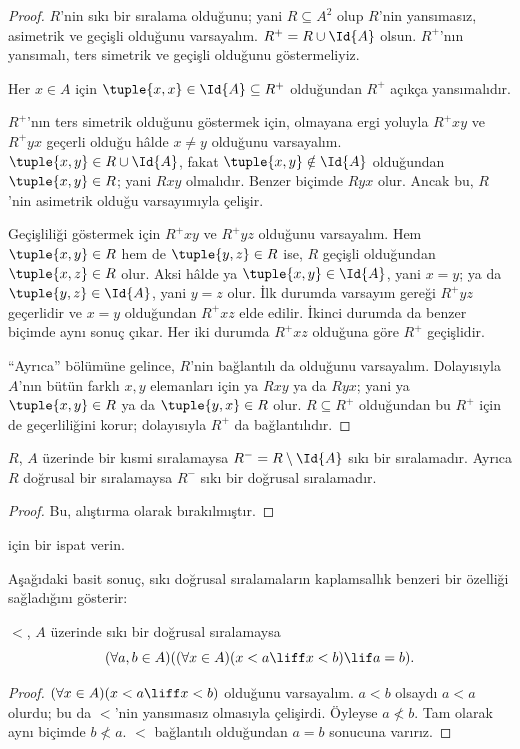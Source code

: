 \documentclass[../../../include/open-logic-section]{subfiles}
\begin{document}
\begin{proof}
$R$'nin sıkı bir sıralama olduğunu; yani $R \subseteq A^2$ olup $R$'nin
yansımasız, asimetrik ve geçişli olduğunu varsayalım. $R^+=R\cup\Id{A}$ olsun.
$R^+$'nın yansımalı, ters simetrik ve geçişli olduğunu göstermeliyiz.

Her $x \in A$ için $\tuple{x,x}\in\Id{A}\subseteq R^+$ olduğundan $R^+$
açıkça yansımalıdır.

$R^+$'nın ters simetrik olduğunu göstermek için, olmayana ergi yoluyla $R^+xy$
ve $R^+yx$ geçerli olduğu hâlde $x \neq y$ olduğunu varsayalım.
$\tuple{x,y}\in R\cup\Id{A}$, fakat $\tuple{x,y}\notin\Id{A}$ olduğundan
$\tuple{x,y}\in R$; yani $Rxy$ olmalıdır. Benzer biçimde $Ryx$ olur. Ancak bu,
$R$'nin asimetrik olduğu varsayımıyla çelişir.

Geçişliliği göstermek için $R^+xy$ ve $R^+yz$ olduğunu varsayalım. Hem
$\tuple{x,y}\in R$ hem de $\tuple{y,z}\in R$ ise, $R$ geçişli olduğundan
$\tuple{x,z}\in R$ olur. Aksi hâlde ya $\tuple{x,y}\in\Id{A}$, yani $x=y$;
ya da $\tuple{y,z}\in\Id{A}$, yani $y=z$ olur. İlk durumda varsayım gereği
$R^+yz$ geçerlidir ve $x=y$ olduğundan $R^+xz$ elde edilir. İkinci durumda da
benzer biçimde aynı sonuç çıkar. Her iki durumda $R^+xz$ olduğuna göre $R^+$
geçişlidir.

``Ayrıca'' bölümüne gelince, $R$'nin bağlantılı da olduğunu varsayalım.
Dolayısıyla $A$'nın bütün farklı $x,y$ elemanları için ya $Rxy$ ya da $Ryx$; yani ya
$\tuple{x,y}\in R$ ya da $\tuple{y,x}\in R$ olur. $R\subseteq R^+$ olduğundan
bu $R^+$ için de geçerliliğini korur; dolayısıyla $R^+$ da bağlantılıdır.
\end{proof}

\begin{prop}
$R$, $A$ üzerinde bir kısmi sıralamaysa $R^-=R\setminus\Id{A}$ sıkı bir
sıralamadır. Ayrıca $R$ doğrusal bir sıralamaysa $R^-$ sıkı bir doğrusal
sıralamadır.
\end{prop}

\begin{proof}
Bu, alıştırma olarak bırakılmıştır.
\end{proof}

\begin{prob}
 için bir ispat verin.
\end{prob}

Aşağıdaki basit sonuç, sıkı doğrusal sıralamaların kaplamsallık benzeri bir
özelliği sağladığını gösterir:

\begin{prop}
$<$, $A$ üzerinde sıkı bir doğrusal sıralamaysa
\[
  (\forall a, b \in A)((\forall x \in A)(x < a \liff x < b) \lif a = b).
\]
\end{prop}

\begin{proof}
$(\forall x \in A)(x<a\liff x<b)$ olduğunu varsayalım. $a<b$ olsaydı
$a<a$ olurdu; bu da $<$'nin yansımasız olmasıyla çelişirdi. Öyleyse
$a\nless b$. Tam olarak aynı biçimde $b\nless a$. $<$ bağlantılı olduğundan
$a=b$ sonucuna varırız.
\end{proof}
\end{document}

